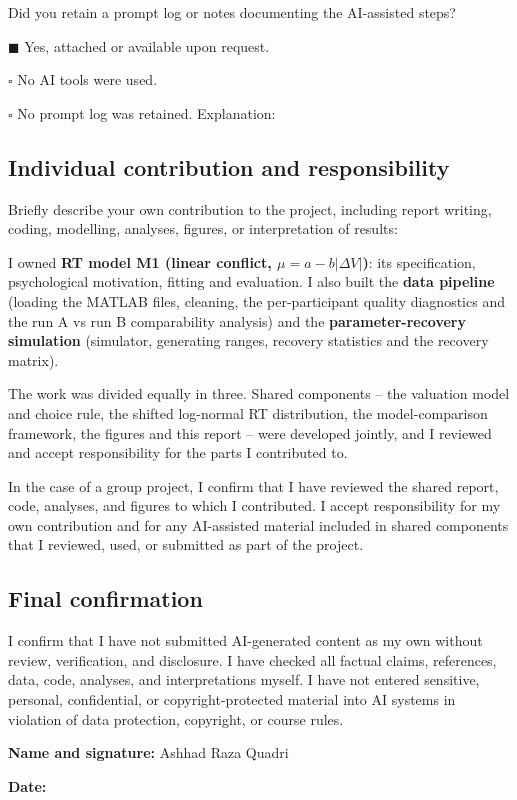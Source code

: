 \documentclass[11pt]{article}
\begin{document}
\noindent
Did you retain a prompt log or notes documenting the AI-assisted steps?

\medskip

\noindent
$\blacksquare$ Yes, attached or available upon request.

\noindent
$\square$ No AI tools were used.

\noindent
$\square$ No prompt log was retained. Explanation:

\bigskip

\subsection*{Individual contribution and responsibility}

\noindent
Briefly describe your own contribution to the project, including report writing,
coding, modelling, analyses, figures, or interpretation of results:

\medskip

\noindent
I owned \textbf{RT model M1 (linear conflict, $\mu=a-b|\Delta V|$)}: its specification, psychological motivation, fitting and evaluation. I also built the \textbf{data pipeline} (loading the MATLAB files, cleaning, the per-participant quality diagnostics and the run A vs run B comparability analysis) and the \textbf{parameter-recovery simulation} (simulator, generating ranges, recovery statistics and the recovery matrix).

\medskip

\noindent
The work was divided equally in three. Shared components -- the valuation model and choice rule, the shifted log-normal RT distribution, the model-comparison framework, the figures and this report -- were developed jointly, and I reviewed and accept responsibility for the parts I contributed to.

\bigskip

\noindent
In the case of a group project, I confirm that I have reviewed the shared report,
code, analyses, and figures to which I contributed. I accept responsibility for my
own contribution and for any AI-assisted material included in shared components
that I reviewed, used, or submitted as part of the project.

\bigskip

\subsection*{Final confirmation}

\noindent
I confirm that I have not submitted AI-generated content as my own without review,
verification, and disclosure. I have checked all factual claims, references, data,
code, analyses, and interpretations myself. I have not entered sensitive,
personal, confidential, or copyright-protected material into AI systems in
violation of data protection, copyright, or course rules.

\bigskip
\bigskip

\noindent
\noindent
\textbf{Name and signature:} Ashhad Raza Quadri\quad
\underline{}

\medskip

\noindent
\textbf{Date:} \underline{}
\end{document}

